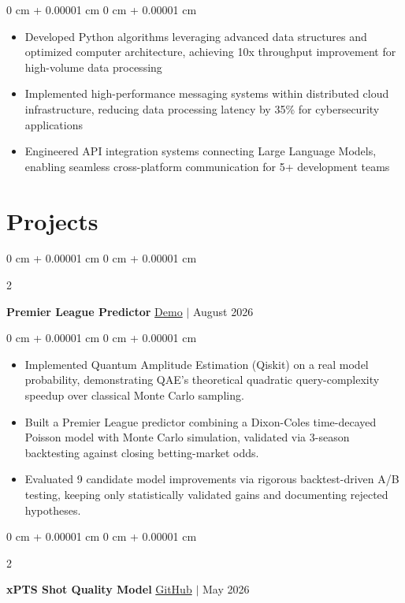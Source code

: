 \documentclass[10pt, letterpaper]{article}
\newenvironment{highlights}{
    \begin{itemize}[
        topsep=0.06 cm,
        parsep=0.06 cm,
        partopsep=0pt,
        itemsep=0pt,
        leftmargin=0 cm + 10pt
    ]
}{
    \end{itemize}
}
\newenvironment{onecolentry}{
    \begin{adjustwidth}{
        0 cm + 0.00001 cm
    }{
        0 cm + 0.00001 cm
    }
}{
    \end{adjustwidth}
}
\newenvironment{twocolentry}[2][]{
    \onecolentry
    \def\secondColumn{#2}
    \setcolumnwidth{\fill, 4.5 cm}
    \begin{paracol}{2}
}{
    \switchcolumn \raggedleft \secondColumn
    \end{paracol}
    \endonecolentry
}
\begin{document}
\vspace{0.06 cm}
\begin{onecolentry}
    \begin{highlights}
        \item Developed Python algorithms leveraging advanced data structures and optimized computer architecture, achieving 10x throughput improvement for high-volume data processing
        \item Implemented high-performance messaging systems within distributed cloud infrastructure, reducing data processing latency by 35\% for cybersecurity applications
        \item Engineered API integration systems connecting Large Language Models, enabling seamless cross-platform communication for 5+ development teams
    \end{highlights}
\end{onecolentry}

\section{Projects}

\begin{twocolentry}{
    \href{https://amin9666.github.io/Premier_League_Prediction_26/}{Demo} $|$ August 2026
}
    \textbf{Premier League Predictor}\end{twocolentry}

\vspace{0.06 cm}
\begin{onecolentry}
    \begin{highlights}
        \item Implemented Quantum Amplitude Estimation (Qiskit) on a real model probability, demonstrating QAE's theoretical quadratic query-complexity speedup over classical Monte Carlo sampling.
        \item Built a Premier League predictor combining a Dixon-Coles time-decayed Poisson model with Monte Carlo simulation, validated via 3-season backtesting against closing betting-market odds.
        \item Evaluated 9 candidate model improvements via rigorous backtest-driven A/B testing, keeping only statistically validated gains and documenting rejected hypotheses.
    \end{highlights}
\end{onecolentry}

\begin{twocolentry}{
    \href{https://github.com/Amin9666/xPTS-Shot-Quality-Model}{GitHub} $|$ May 2026
}
    \textbf{xPTS Shot Quality Model}\end{twocolentry}
\end{document}

